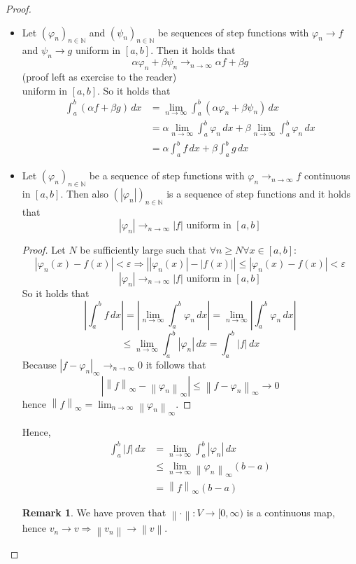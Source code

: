 \documentclass[a4paper,landscape,twocolumn]{article}
\theoremstyle{definition}
\newtheorem{rem}{Remark}
\newcommand\abs[1]{\left|#1\right|}
\newcommand\seq[1]{{\left(#1\right)}_{n \in \mathbb N}}
\newcommand\norm[1]{\left\|#1\right\|}
\newcommand\inorm[1]{\left\|#1\right\|_\infty}
\begin{document}
\begin{proof}
  \begin{itemize}
    \item Let $\seq{\varphi_n}$ and $\seq{\psi_n}$ be sequences of step functions
      with $\varphi_n \to f$ and $\psi_n \to g$ uniform in $[a,b]$.
      Then it holds that
      \[ \alpha \varphi_n + \beta \psi_n \to_{n\to\infty} \alpha f + \beta g \]
      (proof left as exercise to the reader) \\
      uniform in $[a,b]$. So it holds that
      \begin{align*}
        \int_a^b (\alpha f + \beta g) \, dx
          &= \lim_{n\to\infty} \int_a^b (\alpha \varphi_n + \beta \psi_n) \, dx \\
          &= \alpha \lim_{n\to\infty} \int_a^b \varphi_n \, dx + \beta \lim_{n\to\infty} \int_a^b \varphi_n \, dx \\
          &= \alpha \int_a^b f \, dx + \beta \int_a^b g \, dx
      \end{align*}
    \item
      Let $\seq{\varphi_n}$ be a sequence of step functions with $\varphi_n \to_{n\to\infty} f$ continuous
      in $[a,b]$. Then also $\seq{\abs{\varphi_n}}$ is a sequence of step functions and it holds that
      \[ \abs{\varphi_n} \to_{n\to\infty} \abs{f} \text{ uniform in } [a,b] \]
      \begin{proof}
        Let $N$ be sufficiently large such that $\forall n \geq N \forall x \in [a,b]:$
        \[
          \abs{\varphi_n(x) - f(x)} < \varepsilon
          \Rightarrow \abs{\abs{\varphi_n(x)} - \abs{f(x)}} \leq \abs{\varphi_n(x) - f(x)} < \varepsilon
        \] \[
          \abs{\varphi_n} \to_{n\to\infty} \abs{f} \text{ uniform in } [a,b]
        \]
        So it holds that
        \[
          \abs{\int_a^b f \, dx}
          = \abs{\lim_{n\to\infty} \int_a^b \varphi_n \, dx}
          = \lim_{n\to\infty} \abs{\int_a^b \varphi_n \, dx}
        \] \[
          \leq \lim_{n\to\infty} \int_a^b \abs{\varphi_n} \, dx
          = \int_a^b \abs{f} \, dx
        \]
        Because $\abs{f - \varphi_n}_\infty \to_{n\to\infty} 0$ it follows that
        \[ \abs{\inorm{f} - \inorm{\varphi_n}} \leq \inorm{f - \varphi_n} \to 0 \]
        hence $\inorm{f} = \lim_{n\to\infty} \inorm{\varphi_n}$.
      \end{proof}
      Hence,
      \begin{align*}
        \int_a^b \abs{f} \, dx
          &= \lim_{n \to \infty} \int_a^b \abs{\varphi_n} \, dx \\
          &\leq \lim_{n\to\infty} \inorm{\varphi_n} (b - a) \\
          &= \inorm{f} (b - a)
      \end{align*}
      \begin{rem}
        We have proven that $\norm{\cdot}: V \to [0,\infty)$ is a continuous
        map, hence $v_n \to v \Rightarrow \norm{v_n} \to \norm{v}$.
      \end{rem}
  \end{itemize}
\end{proof}
\end{document}
